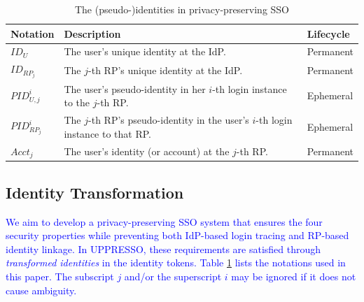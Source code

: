 \begin{table}
\footnotesize
    \caption{The (pseudo-)identities in privacy-preserving SSO}
    \centering
    \begin{tabular}{|p{1.0cm}|p{5.1cm}|p{1.13cm}|} \hline
    {\textbf{Notation}} & {\textbf{Description}} & {\textbf{Lifecycle}} \\ \hline
    {$ID_U$} & {The user's unique identity at the IdP.} & {Permanent} \\ \hline
    {$ID_{RP_j}$} & {The $j$-th RP's unique identity at the IdP.} & {Permanent} \\ \hline
    {$PID_{U,j}^i$} & {The user's pseudo-identity in her $i$-th login instance to the $j$-th RP.} & {Ephemeral} \\ \hline
    {$PID_{RP_j}^i$} & {The $j$-th RP's pseudo-identity in the user's $i$-th login instance to that RP.} & {Ephemeral} \\ \hline
    {$Acct_j$} & {The user's identity (or account) at the $j$-th RP.} & {Permanent} \\ \hline
    \end{tabular}
    \label{tbl:notations-dilemma}
\end{table}

\subsection{Identity Transformation}
\label{subsec:solutions}

\textcolor{blue}{We aim to develop a privacy-preserving SSO system that ensures the four security properties while preventing both IdP-based login tracing and RP-based identity linkage.
In UPPRESSO, these requirements are satisfied through \emph{transformed identities} in the identity tokens. Table \ref{tbl:notations-dilemma} lists the notations used in this paper.
The subscript $j$ and/or the superscript $i$ may be ignored if it does not cause ambiguity.}

